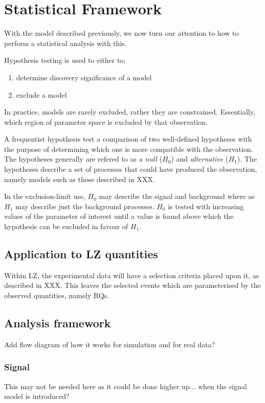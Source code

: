 \section{Statistical Framework}
With the model described previously, we now turn our attention to how to perform a statistical analysis with this.

\cite{LZ_Ibles_LZStats_Thesis_ref}

Hypothesis testing is used to either to;
\begin{enumerate}
    \item determine discovery significance of a model
    \item exclude a model
\end{enumerate}
In practice, models are rarely excluded, rather they are constrained.
Essentially, which region of parameter space is excluded by that observation.

\par
A frequentist hypothesis test a comparison of two well-defined hypotheses with the purpose of determining which one is more compatible with the observation.
The hypotheses generally are refered to as a \emph{null} ($H_{0}$) and \emph{alternative} ($H_{1}$).
The hypotheses describe a set of processes that could have produced the observation, namely models such as those described in XXX.

\par
In the exclusion-limit use, $H_{0}$ may describe the signal and background where as $H_{1}$ may describe just the background processes.
$H_{0}$ is tested with increasing values of the parameter of interest until a value is found above which the hypothesis can be excluded in favour of $H_{1}$.


\subsection{Application to LZ quantities}
\par
Within LZ, the experimental data will have a selection criteria placed upon it, as described in XXX.
This leaves the selected events which are parameterised by the observed quantities, namely RQs.

\subsection{Analysis framework}
\par
Add flow diagram of how it works for simulation and for real data?
\subsubsection{Signal}
\par
This may not be needed here as it could be done higher up... when the signal model is introduced?
